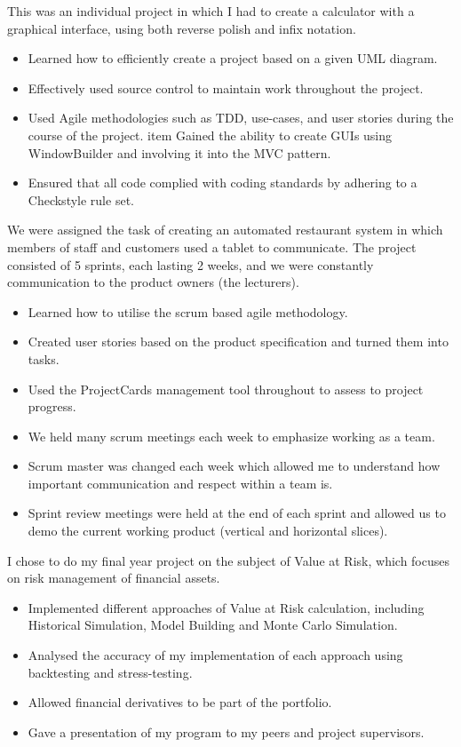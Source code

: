 \documentclass[10pt,a4paper]{moderncv}
\begin{document}
    {
    This was an individual project in which I had to create a calculator with a graphical interface, using both reverse polish and infix notation.
    \begin{itemize}
        \item Learned how to efficiently create a project based on a given UML diagram.
        \item Effectively used source control to maintain work throughout the project.
        \item Used Agile methodologies such as TDD, use-cases, and user stories during the course of the project.
        item Gained the ability to create GUIs using WindowBuilder and involving it into the MVC pattern.
        \item Ensured that all code complied with coding standards by adhering to a Checkstyle rule set.
    \end{itemize}
    }
    {
    We were assigned the task of creating an automated restaurant system in which members of staff and customers used a tablet to communicate. The project consisted of 5 sprints, each lasting 2 weeks, and we were constantly communication to the product owners (the lecturers).
    \begin{itemize}
        \item Learned how to utilise the scrum based agile methodology.
        \item Created user stories based on the product specification and turned them into tasks.
        \item Used the ProjectCards management tool throughout to assess to project progress.
        \item We held many scrum meetings each week to emphasize working as a team.
        \item Scrum master was changed each week which allowed me to understand how important communication and respect within a team is.
        \item Sprint review meetings were held at the end of each sprint and allowed us to demo the current working product (vertical and horizontal slices).
    \end{itemize}
    }

    {
    I chose to do my final year project on the subject of Value at Risk, which focuses on risk management of financial assets.
    \begin{itemize}
        \item Implemented different approaches of Value at Risk calculation, including Historical Simulation, Model Building and Monte Carlo Simulation.
        \item Analysed the accuracy of my implementation of each approach using backtesting and stress-testing.
        \item Allowed financial derivatives to be part of the portfolio.
        \item Gave a presentation of my program to my peers and project supervisors.
    \end{itemize}
    }
\end{document}
